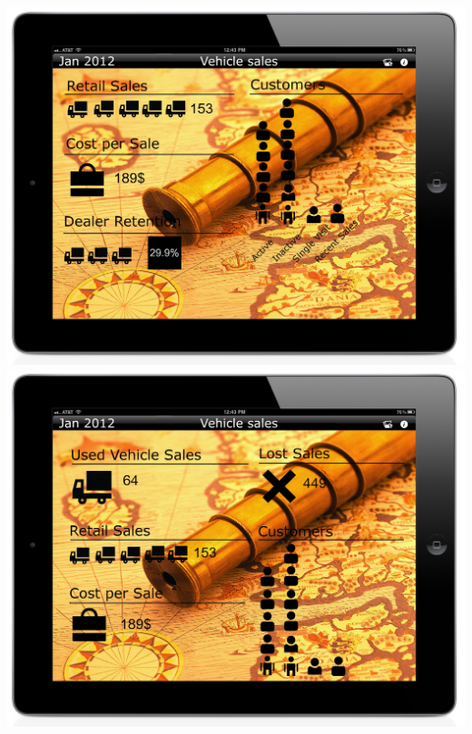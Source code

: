 \documentclass[11pt,a4paper,oneside]{article}
\begin{document}
\includegraphics[width=1\textwidth]{images/screen5.jpg}\\

\includegraphics[width=1\textwidth]{images/screen3.jpg}\\
\end{document}
